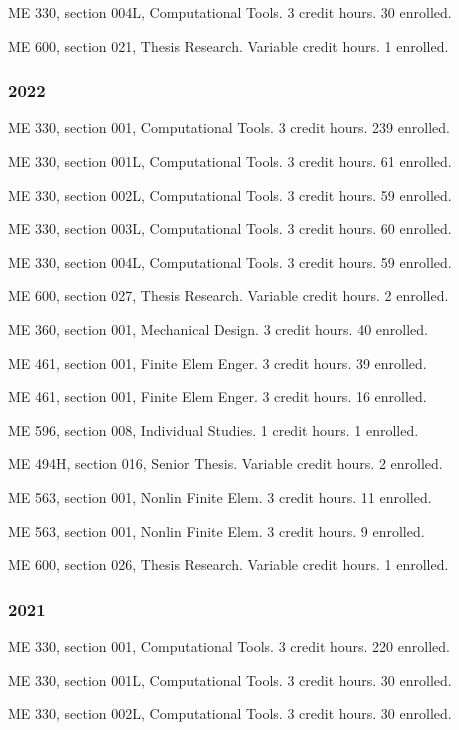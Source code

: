 \documentclass[
]{article}
\begin{document}
ME 330, section 004L, Computational Tools. 3 credit hours. 30 enrolled.

ME 600, section 021, Thesis Research. Variable credit hours. 1 enrolled.

\subsubsection{2022}\label{section-2}

ME 330, section 001, Computational Tools. 3 credit hours. 239 enrolled.

ME 330, section 001L, Computational Tools. 3 credit hours. 61 enrolled.

ME 330, section 002L, Computational Tools. 3 credit hours. 59 enrolled.

ME 330, section 003L, Computational Tools. 3 credit hours. 60 enrolled.

ME 330, section 004L, Computational Tools. 3 credit hours. 59 enrolled.

ME 600, section 027, Thesis Research. Variable credit hours. 2 enrolled.

ME 360, section 001, Mechanical Design. 3 credit hours. 40 enrolled.

ME 461, section 001, Finite Elem Enger. 3 credit hours. 39 enrolled.

ME 461, section 001, Finite Elem Enger. 3 credit hours. 16 enrolled.

ME 596, section 008, Individual Studies. 1 credit hours. 1 enrolled.

ME 494H, section 016, Senior Thesis. Variable credit hours. 2 enrolled.

ME 563, section 001, Nonlin Finite Elem. 3 credit hours. 11 enrolled.

ME 563, section 001, Nonlin Finite Elem. 3 credit hours. 9 enrolled.

ME 600, section 026, Thesis Research. Variable credit hours. 1 enrolled.

\subsubsection{2021}\label{section-3}

ME 330, section 001, Computational Tools. 3 credit hours. 220 enrolled.

ME 330, section 001L, Computational Tools. 3 credit hours. 30 enrolled.

ME 330, section 002L, Computational Tools. 3 credit hours. 30 enrolled.
\end{document}
